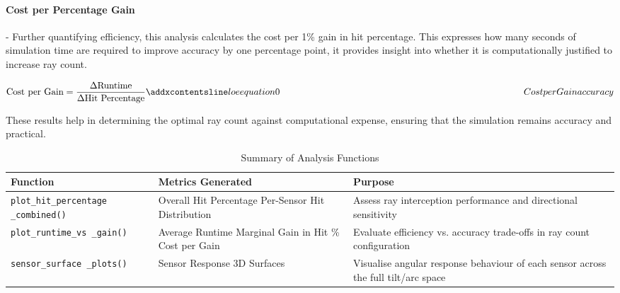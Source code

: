\paragraph{\textbf{Cost per Percentage Gain}}
- Further quantifying efficiency, this analysis calculates the cost per 1\% gain in hit percentage. This expresses how many seconds of simulation time are required to improve accuracy by one percentage point, it provides insight into whether it is computationally justified to increase ray count. 

\begin{equation}
    \text{Cost per Gain} = \frac{\Delta \text{Runtime}}{\Delta \text{Hit Percentage}}
    \label{eq:Cost_per_Gain}
    \addequation{Cost per Gain accuracy}
\end{equation}

\vspace{1em}
These results help in determining the optimal ray count against computational expense, ensuring that the simulation remains accuracy and practical.


    \begin{table}[h]
        \centering
        \caption{Summary of Analysis Functions}
        \label{tab:analysis_summary}
        \begin{tabular}{>{\raggedright}p{4cm} >{\raggedright}p{5cm} >{\raggedright\arraybackslash}p{5cm}}
            \toprule
            \textbf{Function} & \textbf{Metrics Generated} & \textbf{Purpose} \\
            \midrule
            \texttt{plot\_hit\_percentage \_combined()} & Overall Hit Percentage \newline Per-Sensor Hit Distribution & Assess ray interception performance and directional sensitivity \\
            \texttt{plot\_runtime\_vs \_gain()} & Average Runtime \newline Marginal Gain in Hit \% \newline Cost per Gain & Evaluate efficiency vs. accuracy trade-offs in ray count configuration \\
            \texttt{sensor\_surface \_plots()} & Sensor Response 3D Surfaces & Visualise angular response behaviour of each sensor across the full tilt/arc space \\
            \bottomrule
        \end{tabular}
    \end{table}

